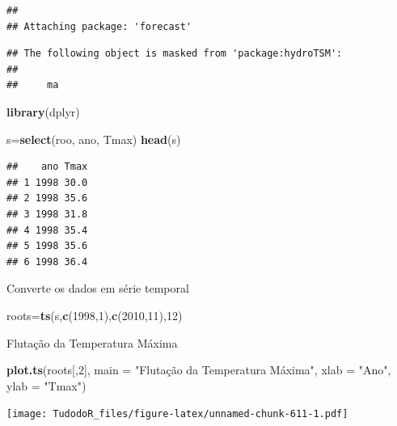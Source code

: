 \documentclass[
]{book}
\newenvironment{Shaded}{\begin{snugshade}}{\end{snugshade}}
\newcommand{\DataTypeTok}[1]{\textcolor[rgb]{0.13,0.29,0.53}{#1}}
\newcommand{\DecValTok}[1]{\textcolor[rgb]{0.00,0.00,0.81}{#1}}
\newcommand{\KeywordTok}[1]{\textcolor[rgb]{0.13,0.29,0.53}{\textbf{#1}}}
\newcommand{\NormalTok}[1]{#1}
\newcommand{\StringTok}[1]{\textcolor[rgb]{0.31,0.60,0.02}{#1}}
\begin{document}
\begin{verbatim}
## 
## Attaching package: 'forecast'
\end{verbatim}

\begin{verbatim}
## The following object is masked from 'package:hydroTSM':
## 
##     ma
\end{verbatim}

\begin{Shaded}
\begin{Highlighting}[]
\KeywordTok{library}\NormalTok{(dplyr)}
\end{Highlighting}
\end{Shaded}

\begin{Shaded}
\begin{Highlighting}[]
\NormalTok{s=}\KeywordTok{select}\NormalTok{(roo, ano, Tmax)}
\KeywordTok{head}\NormalTok{(s)}
\end{Highlighting}
\end{Shaded}

\begin{verbatim}
##    ano Tmax
## 1 1998 30.0
## 2 1998 35.6
## 3 1998 31.8
## 4 1998 35.4
## 5 1998 35.6
## 6 1998 36.4
\end{verbatim}

Converte os dados em série temporal

\begin{Shaded}
\begin{Highlighting}[]
\NormalTok{roots=}\KeywordTok{ts}\NormalTok{(s,}\KeywordTok{c}\NormalTok{(}\DecValTok{1998}\NormalTok{,}\DecValTok{1}\NormalTok{),}\KeywordTok{c}\NormalTok{(}\DecValTok{2010}\NormalTok{,}\DecValTok{11}\NormalTok{),}\DecValTok{12}\NormalTok{)}
\end{Highlighting}
\end{Shaded}

Flutação da Temperatura Máxima

\begin{Shaded}
\begin{Highlighting}[]
\KeywordTok{plot.ts}\NormalTok{(roots[,}\DecValTok{2}\NormalTok{], }\DataTypeTok{main =} \StringTok{"Flutação da Temperatura Máxima"}\NormalTok{, }\DataTypeTok{xlab =} \StringTok{"Ano"}\NormalTok{, }\DataTypeTok{ylab =} \StringTok{"Tmax"}\NormalTok{)}
\end{Highlighting}
\end{Shaded}

\texttt{[image: TudodoR\_files/figure-latex/unnamed-chunk-611-1.pdf]}
\end{document}
